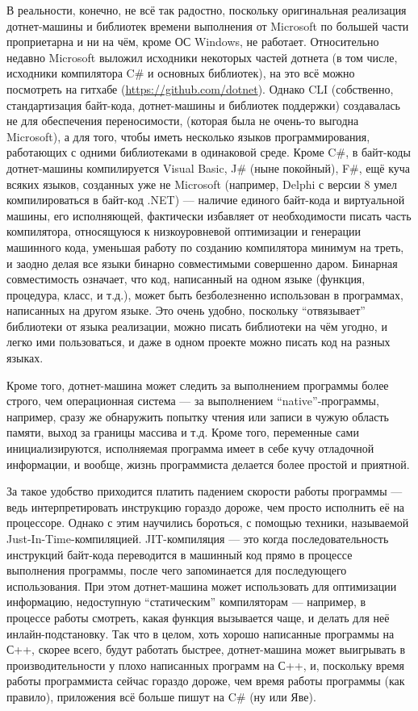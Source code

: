 \documentclass[a5paper]{article}
\begin{document}
В реальности, конечно, не всё так радостно, поскольку оригинальная реализация дотнет-машины и библиотек времени выполнения от Microsoft по большей части проприетарна и ни на чём, кроме ОС Windows, не работает. Относительно недавно Microsoft выложил исходники некоторых частей дотнета (в том числе, исходники компилятора C\# и основных библиотек), на это всё можно посмотреть на гитхабе (\url{https://github.com/dotnet}). Однако CLI (собственно, стандартизация байт-кода, дотнет-машины и библиотек поддержки) создавалась не для обеспечения переносимости, (которая была не очень-то выгодна Microsoft), а для того, чтобы иметь несколько языков программирования, работающих с одними библиотеками в одинаковой среде. Кроме C\#, в байт-коды дотнет-машины компилируется Visual Basic, J\# (ныне покойный), F\#, ещё куча всяких языков, созданных уже не Microsoft (например, Delphi с версии 8 умел компилироваться в байт-код .NET) --- наличие единого байт-кода и виртуальной машины, его исполняющей, фактически избавляет от необходимости писать часть компилятора, относящуюся к низкоуровневой оптимизации и генерации машинного кода, уменьшая работу по созданию компилятора минимум на треть, и заодно делая все языки бинарно совместимыми совершенно даром. Бинарная совместимость означает, что код, написанный на одном языке (функция, процедура, класс, и т.д.), может быть безболезненно использован в программах, написанных на другом языке. Это очень удобно, поскольку ``отвязывает'' библиотеки от языка реализации, можно писать библиотеки на чём угодно, и легко ими пользоваться, и даже в одном проекте можно писать код на разных языках. 

Кроме того, дотнет-машина может следить за выполнением программы более строго, чем операционная система --- за выполнением ``native''-программы, например, сразу же обнаружить попытку чтения или записи в чужую область памяти, выход за границы массива и т.д. Кроме того, переменные сами инициализируются, исполняемая программа имеет в себе кучу отладочной информации, и вообще, жизнь программиста делается более простой и приятной.

За такое удобство приходится платить падением скорости работы программы --- ведь интерпретировать инструкцию гораздо дороже, чем просто исполнить её на процессоре. Однако с этим научились бороться, с помощью техники, называемой Just-In-Time-компиляцией. JIT-компиляция --- это когда последовательность инструкций байт-кода переводится в машинный код прямо в процессе выполнения программы, после чего запоминается для последующего использования. При этом дотнет-машина может использовать для оптимизации информацию, недоступную ``статическим'' компиляторам --- например, в процессе работы смотреть, какая функция вызывается чаще, и делать для неё инлайн-подстановку. Так что в целом, хоть хорошо написанные программы на С++, скорее всего, будут работать быстрее, дотнет-машина может выигрывать в производительности у плохо написанных программ на С++, и, поскольку время работы программиста сейчас гораздо дороже, чем время работы программы (как правило), приложения всё больше пишут на C\# (ну или Яве).
\end{document}
